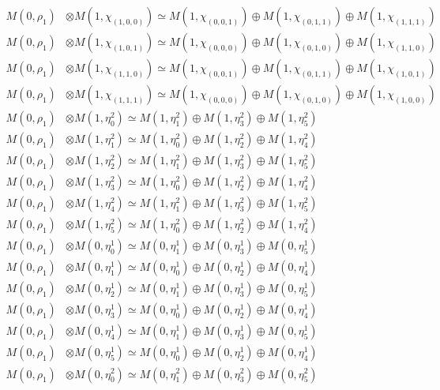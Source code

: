 \begin{align*}
M(0,\rho_{1}) &\otimes M(1,\chi_{(1,0,0)}) \simeq M(1,\chi_{(0,0,1)}) \oplus M(1,\chi_{(0,1,1)}) \oplus M(1,\chi_{(1,1,1)}) \\
M(0,\rho_{1}) &\otimes M(1,\chi_{(1,0,1)}) \simeq M(1,\chi_{(0,0,0)}) \oplus M(1,\chi_{(0,1,0)}) \oplus M(1,\chi_{(1,1,0)}) \\
M(0,\rho_{1}) &\otimes M(1,\chi_{(1,1,0)}) \simeq M(1,\chi_{(0,0,1)}) \oplus M(1,\chi_{(0,1,1)}) \oplus M(1,\chi_{(1,0,1)}) \\
M(0,\rho_{1}) &\otimes M(1,\chi_{(1,1,1)}) \simeq M(1,\chi_{(0,0,0)}) \oplus M(1,\chi_{(0,1,0)}) \oplus M(1,\chi_{(1,0,0)}) \\
M(0,\rho_{1}) &\otimes M(1,\eta^{2}_{0}) \simeq M(1,\eta^{2}_{1}) \oplus M(1,\eta^{2}_{3}) \oplus M(1,\eta^{2}_{5}) \\
M(0,\rho_{1}) &\otimes M(1,\eta^{2}_{1}) \simeq M(1,\eta^{2}_{0}) \oplus M(1,\eta^{2}_{2}) \oplus M(1,\eta^{2}_{4}) \\
M(0,\rho_{1}) &\otimes M(1,\eta^{2}_{2}) \simeq M(1,\eta^{2}_{1}) \oplus M(1,\eta^{2}_{3}) \oplus M(1,\eta^{2}_{5}) \\
M(0,\rho_{1}) &\otimes M(1,\eta^{2}_{3}) \simeq M(1,\eta^{2}_{0}) \oplus M(1,\eta^{2}_{2}) \oplus M(1,\eta^{2}_{4}) \\
M(0,\rho_{1}) &\otimes M(1,\eta^{2}_{4}) \simeq M(1,\eta^{2}_{1}) \oplus M(1,\eta^{2}_{3}) \oplus M(1,\eta^{2}_{5}) \\
M(0,\rho_{1}) &\otimes M(1,\eta^{2}_{5}) \simeq M(1,\eta^{2}_{0}) \oplus M(1,\eta^{2}_{2}) \oplus M(1,\eta^{2}_{4}) \\
M(0,\rho_{1}) &\otimes M(0,\eta^{1}_{0}) \simeq M(0,\eta^{1}_{1}) \oplus M(0,\eta^{1}_{3}) \oplus M(0,\eta^{1}_{5}) \\
M(0,\rho_{1}) &\otimes M(0,\eta^{1}_{1}) \simeq M(0,\eta^{1}_{0}) \oplus M(0,\eta^{1}_{2}) \oplus M(0,\eta^{1}_{4}) \\
M(0,\rho_{1}) &\otimes M(0,\eta^{1}_{2}) \simeq M(0,\eta^{1}_{1}) \oplus M(0,\eta^{1}_{3}) \oplus M(0,\eta^{1}_{5}) \\
M(0,\rho_{1}) &\otimes M(0,\eta^{1}_{3}) \simeq M(0,\eta^{1}_{0}) \oplus M(0,\eta^{1}_{2}) \oplus M(0,\eta^{1}_{4}) \\
M(0,\rho_{1}) &\otimes M(0,\eta^{1}_{4}) \simeq M(0,\eta^{1}_{1}) \oplus M(0,\eta^{1}_{3}) \oplus M(0,\eta^{1}_{5}) \\
M(0,\rho_{1}) &\otimes M(0,\eta^{1}_{5}) \simeq M(0,\eta^{1}_{0}) \oplus M(0,\eta^{1}_{2}) \oplus M(0,\eta^{1}_{4}) \\
M(0,\rho_{1}) &\otimes M(0,\eta^{2}_{0}) \simeq M(0,\eta^{2}_{1}) \oplus M(0,\eta^{2}_{3}) \oplus M(0,\eta^{2}_{5}) \\

\end{align*}
